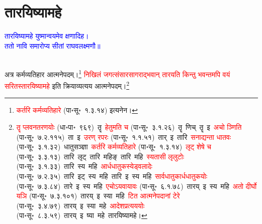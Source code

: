 \section[तारयिष्यामहे]{तारयिष्यामहे}
\centering\textcolor{blue}{तारयिष्यामहे युष्मान्वयमेव क्षणादिह।\nopagebreak\\
ततो नावि समारोप्य सीतां राघवलक्ष्मणौ॥}\nopagebreak\\
\\
\fontsize{14}{21}\selectfont\begin{sloppypar}\justifying\noindent\hspace{10mm} अत्र कर्म\-व्यतिहार आत्मनेपदम्।\footnote{\textcolor{red}{कर्तरि कर्मव्यतिहारे} (पा॰सू॰~१.३.१४) इत्यनेन।} \textcolor{red}{निखिलं जगत्संसार\-सागराद्भवान् तारयति किन्तु भवन्तमपि वयं सरितस्तारयिष्यामहे} इति क्रिया\-व्यत्यय आत्मनेपदम्।\footnote{\textcolor{red}{तॄ प्लवनतरणयोः} (धा॰पा॰~९६९)~\arrow तॄ~\arrow \textcolor{red}{हेतुमति च} (पा॰सू॰~३.१.२६)~\arrow तॄ~णिच्~\arrow तॄ~इ~\arrow \textcolor{red}{अचो ञ्णिति} (पा॰सू॰~७.२.११५)~\arrow ता~इ~\arrow \textcolor{red}{उरण् रपरः} (पा॰सू॰~१.१.५१)~\arrow तार्~इ~\arrow तारि~\arrow \textcolor{red}{सनाद्यन्ता धातवः} (पा॰सू॰~३.१.३२)~\arrow धातु\-सञ्ज्ञा~\arrow \textcolor{red}{कर्तरि कर्मव्यतिहारे} (पा॰सू॰~१.३.१४)~\arrow \textcolor{red}{लृट् शेषे च} (पा॰सू॰~३.३.१३)~\arrow तारि~लृट्~\arrow तारि~महिङ्~\arrow तारि~महि~\arrow \textcolor{red}{स्यतासी लृलुटोः} (पा॰सू॰~३.१.३३)~\arrow तारि~स्य~महि~\arrow \textcolor{red}{आर्धधातुकस्येड्वलादेः} (पा॰सू॰~७.२.३५)~\arrow तारि~इट्~स्य~महि~\arrow तारि~इ~स्य~महि~\arrow \textcolor{red}{सार्वधातुकार्ध\-धातुकयोः} (पा॰सू॰~७.३.८४)~\arrow तारे~इ~स्य~महि~\arrow \textcolor{red}{एचोऽयवायावः} (पा॰सू॰~६.१.७८)~\arrow तारय्~इ~स्य~महि~\arrow \textcolor{red}{अतो दीर्घो यञि} (पा॰सू॰~७.३.१०१)~\arrow तारय्~इ~स्या~महि~\arrow \textcolor{red}{टित आत्मनेपदानां टेरे} (पा॰सू॰~३.४.७९)~\arrow तारय्~इ~स्या~महे~\arrow \textcolor{red}{आदेश\-प्रत्यययोः} (पा॰सू॰~८.३.५९)~\arrow तारय्~इ~ष्या~महे~\arrow तारयिष्यामहे।}\end{sloppypar}
